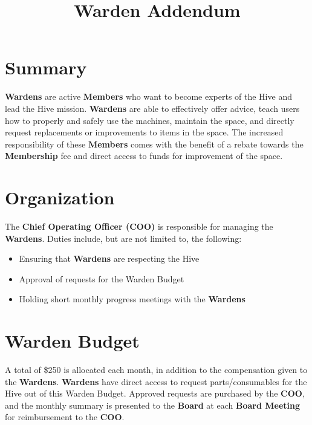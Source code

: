 \documentclass[11pt, oneside]{article}   	%
\title{Warden Addendum}
\begin{document}
\maketitle

\section{Summary}
\textbf{Wardens} are active \textbf{Members} who want to become experts of the Hive and lead the Hive mission.
\textbf{Wardens} are able to effectively offer advice, teach users how to properly and safely use the machines, maintain the space, and directly request replacements or improvements to items in the space.
The increased responsibility of these \textbf{Members} comes with the benefit of a rebate towards the \textbf{Membership} fee and direct access to funds for improvement of the space.

\section{Organization}
The \textbf{Chief Operating Officer (COO)} is responsible for managing the \textbf{Wardens}. Duties include, but are not limited to, the following:
\begin{itemize}[noitemsep]
\item Ensuring that \textbf{Wardens} are respecting the Hive
\item Approval of requests for the Warden Budget
\item Holding short monthly progress meetings with the \textbf{Wardens}
\end{itemize}

\section{Warden Budget}
A total of \$250 is allocated each month, in addition to the compensation given to the \textbf{Wardens}.
\textbf{Wardens} have direct access to request parts/consumables for the Hive out of this Warden Budget.
Approved requests are purchased by the \textbf{COO}, and the monthly summary is presented to the \textbf{Board} at each \textbf{Board Meeting} for reimbursement to the \textbf{COO}.
\end{document}
